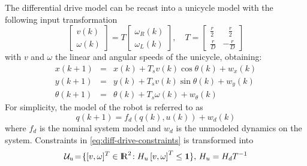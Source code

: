 \documentclass[letterpaper, 10 pt, conference]{ieeeconf}
\newcommand{\rr}{\mathop{{\rm I}\mskip-4.0mu{\rm R}}\nolimits}
\begin{document}
The differential drive model can be recast into a unicycle model with the following input transformation
%
\begin{equation}\label{eq:diff-uni-transformation}
  \left[
    \begin{array}{c}
      v(k)\\
      \omega(k)
    \end{array}
  \right]
  =
  T
  \left[
    \begin{array}{c}
      \omega_R(k)\\
      \omega_L(k)
    \end{array}
  \right],\quad T=\left[
    \begin{array}{cc}
      \frac{r}{2}&\,\,\,\,\frac{r}{2}\\
      \frac{r}{D}&-\frac{r}{D}
    \end{array}
  \right]
\end{equation}
%
with $v$ and $\omega$ the linear and angular speeds of the unicycle, obtaining:
%
\begin{equation}\label{eq:unicycle-disrete}
  \begin{array}{rcl}
    x(k+1)&=&x(k)+T_s v(k)\cos \theta(k) + w_x(k)\\
    y(k+1)&=&y(k)+T_s v(k)\sin \theta(k)+ w_y(k)\\
    \theta(k+1)&=&\theta(k)+T_s\omega(k)+ w_{\theta}(k)
  \end{array}
\end{equation}
%
For simplicity, the model of the robot is referred to as
\begin{equation*}
  q(k+1) = f_d(q(k),u(k)) + w_d(k)
\end{equation*}
where $f_d$ is the nominal system model and $w_d$ is the unmodeled dynamics on the system.  Constraints in \eqref{eq:diff-drive-constraints} is transformed into
\begin{equation}\label{eq:input-constraint-unicycle}
  \mathcal{U}_u\!=\!\{[v,\omega]^T\in\rr^2\!: H_u\left[v,\omega \right]^T\leq \mathbf{1}\},\, H_u=H_dT^{-1}
\end{equation}
\end{document}
